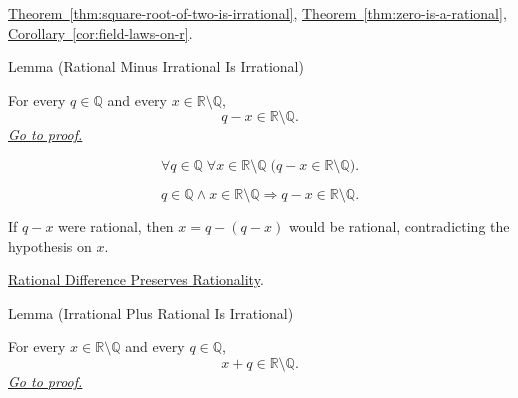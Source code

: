 \begin{dependencies}
\hyperref[thm:square-root-of-two-is-irrational]{Theorem~\ref*{thm:square-root-of-two-is-irrational}},
\hyperref[thm:zero-is-a-rational]{Theorem~\ref*{thm:zero-is-a-rational}},
\hyperref[cor:field-laws-on-r]{Corollary~\ref*{cor:field-laws-on-r}}.
\end{dependencies}

\begin{lemmabox}{Lemma (Rational Minus Irrational Is Irrational)}
\begin{lemma}
\label{lem:rational-minus-irrational-is-irrational}
For every $q\in\mathbb{Q}$ and every $x\in\mathbb{R}\setminus\mathbb{Q}$,
\[
  q-x\in\mathbb{R}\setminus\mathbb{Q}.
\]
\hyperref[prf:rational-minus-irrational-is-irrational]{\textit{Go to proof.}}
\end{lemma}
\end{lemmabox}

\begin{remark*}
\[
\forall q\in\mathbb{Q}\;\forall x\in\mathbb{R}\setminus\mathbb{Q}\;
\bigl(q-x\in\mathbb{R}\setminus\mathbb{Q}\bigr).
\]
\end{remark*}

\begin{remark*}
\[
q\in\mathbb{Q}\land x\in\mathbb{R}\setminus\mathbb{Q}
\Longrightarrow q-x\in\mathbb{R}\setminus\mathbb{Q}.
\]
\end{remark*}

\begin{remark*}[Interpretation]
If $q-x$ were rational, then $x=q-(q-x)$ would be rational, contradicting the
hypothesis on $x$.
\end{remark*}

\begin{dependencies}
\hyperref[lem:rational-difference-preserves-rationality]{Rational Difference Preserves Rationality}.
\end{dependencies}

\begin{lemmabox}{Lemma (Irrational Plus Rational Is Irrational)}
\begin{lemma}
\label{lem:irrational-plus-rational-is-irrational}
For every $x\in\mathbb{R}\setminus\mathbb{Q}$ and every $q\in\mathbb{Q}$,
\[
  x+q\in\mathbb{R}\setminus\mathbb{Q}.
\]
\hyperref[prf:irrational-plus-rational-is-irrational]{\textit{Go to proof.}}
\end{lemma}
\end{lemmabox}

